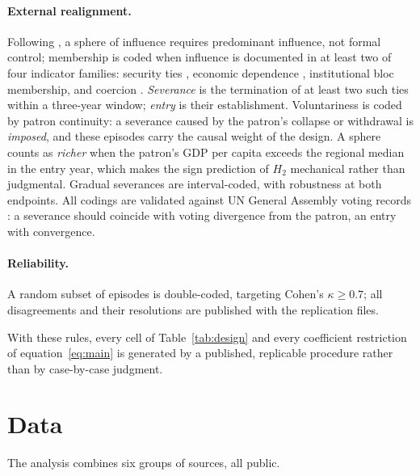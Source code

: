 \documentclass[11pt]{article}
\begin{document}
\paragraph{External realignment.} Following \textcite{keal_1983}, a sphere of influence requires predominant influence, not formal control; membership is coded when influence is documented in at least two of four indicator families: security ties \parencite{leeds_etal_2002,gibler_sarkees_2004}, economic dependence \parencite{imf_dots}, institutional bloc membership, and coercion \parencite{felbermayr_etal_2020}. \emph{Severance} is the termination of at least two such ties within a three-year window; \emph{entry} is their establishment. Voluntariness is coded by patron continuity: a severance caused by the patron's collapse or withdrawal is \emph{imposed}, and these episodes carry the causal weight of the design. A sphere counts as \emph{richer} when the patron's GDP per capita exceeds the regional median in the entry year, which makes the sign prediction of $H_2$ mechanical rather than judgmental. Gradual severances are interval-coded, with robustness at both endpoints. All codings are validated against UN General Assembly voting records \parencite{bailey_strezhnev_voeten_2017}: a severance should coincide with voting divergence from the patron, an entry with convergence.

\paragraph{Reliability.} A random subset of episodes is double-coded, targeting Cohen's $\kappa \geq 0.7$; all disagreements and their resolutions are published with the replication files.

With these rules, every cell of Table~\ref{tab:design} and every coefficient restriction of equation~\eqref{eq:main} is generated by a published, replicable procedure rather than by case-by-case judgment.

\section{Data}
\label{sec:data}

The analysis combines six groups of sources, all public.
\end{document}

